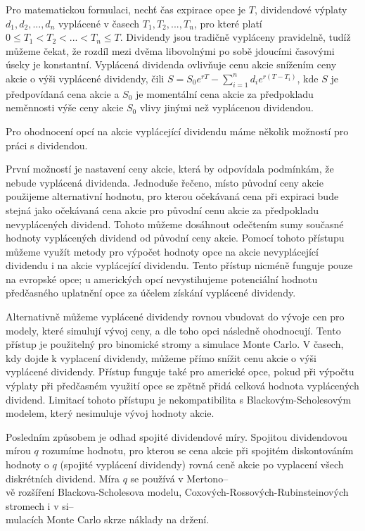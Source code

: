 \documentclass[male,czech,api_bc]{kitheses}
\begin{document}
  Pro matematickou formulaci, nechť čas expirace opce je $T$, dividendové výplaty $d_1, d_2, ..., d_n$ vyplácené v časech $T_1, T_2, ..., T_n$, pro které platí $0 \le T_1 < T_2 < ... < T_n \le T$. Dividendy jsou tradičně vypláceny pravidelně, tudíž můžeme čekat, že rozdíl mezi dvěma libovolnými po sobě jdoucími časovými úseky je konstantní.
  Vyplácená dividenda ovlivňuje cenu akcie snížením ceny akcie o výši vyplácené dividendy, čili $S = S_0 e^{rT} - \sum \limits_{i = 1}^{n} d_i e^{r(T - T_i)}$, kde $S$ je předpovídaná cena akcie a $S_0$ je momentální cena akcie za předpokladu neměnnosti výše ceny akcie $S_0$ vlivy jinými než vyplácenou dividendou.

  Pro ohodnocení opcí na akcie vyplácející dividendu máme několik možností pro práci s dividendou.

  První možností je nastavení ceny akcie, která by odpovídala podmínkám, že nebude vyplácená dividenda. Jednoduše řečeno, místo původní ceny akcie použijeme alternativní hodnotu, pro kterou očekávaná cena při expiraci bude stejná jako očekávaná cena akcie pro původní cenu akcie za předpokladu nevyplácených dividend. Tohoto můžeme dosáhnout odečtením sumy současné hodnoty vyplácených dividend od původní ceny akcie. Pomocí tohoto přístupu můžeme využít metody pro výpočet hodnoty opce na akcie nevyplácející dividendu i na akcie vyplácející dividendu. Tento přístup nicméně funguje pouze na evropské opce; u amerických opcí nevystihujeme potenciální hodnotu předčasného uplatnění opce za účelem získání vyplácené dividendy.

  Alternativně můžeme vyplácené dividendy rovnou vbudovat do vývoje cen pro modely, které simulují vývoj ceny, a dle toho opci následně ohodnocují. Tento přístup je použitelný pro binomické stromy a simulace Monte Carlo. V časech, kdy dojde k vyplacení dividendy, můžeme přímo snížit cenu akcie o výši vyplácené dividendy. Přístup funguje také pro americké opce, pokud při výpočtu výplaty při předčasném využití opce se zpětně přidá celková hodnota vyplácených dividend. Limitací tohoto přístupu je nekompatibilita s Blackovým-Scholesovým modelem, který nesimuluje vývoj hodnoty akcie.

  Posledním způsobem je odhad spojité dividendové míry. Spojitou dividendovou mírou $q$ rozumíme hodnotu, pro kterou se cena akcie při spojitém diskontováním hodnoty o $q$ (spojité vyplácení dividendy) rovná ceně akcie po vyplacení všech diskrétních dividend. Míra $q$ se používá v Mertono--\\vě rozšíření Blackova-Scholesova modelu, Coxových-Rossových-Rubinsteinových stromech i v si--\\mulacích Monte Carlo skrze náklady na držení.
\end{document}

